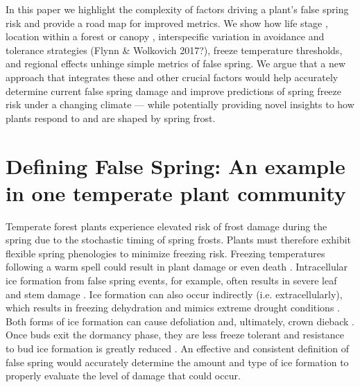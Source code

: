 \documentclass{article}\usepackage[]{graphicx}\usepackage[]{color}
\begin{document}
In this paper we highlight the complexity of factors driving a plant's false spring risk and provide a road map for improved metrics. We show how life stage \citep{Caffarra2011}, location within a forest or canopy \citep{Augspurger2013}, interspecific variation in avoidance and tolerance strategies (Flynn \& Wolkovich 2017?), freeze temperature thresholds, and regional effects \citep{Martin2010} unhinge simple metrics of false spring. We argue that a new approach that integrates these and other crucial factors would help accurately determine current false spring damage and improve predictions of spring freeze risk under a changing climate --- while potentially providing novel insights to how plants respond to and are shaped by spring frost. %

\section{Defining False Spring: An example in one temperate plant community}
Temperate forest plants experience elevated risk of frost damage during the spring due to the stochastic timing of spring frosts. 
Plants must therefore exhibit flexible spring phenologies to minimize freezing risk. Freezing temperatures following a warm spell could result in plant damage or even death \citep{Ludlum1968, Mock2007}. Intracellular ice formation from false spring events, for example, often results in severe leaf and stem damage \citep{Burke1976, Sakai1987}. Ice formation can also occur indirectly (i.e. extracellularly), which results in freezing dehydration and mimics extreme drought conditions \citep{Pearce2001, Beck2004, Hofmann2015}. Both forms of ice formation can cause defoliation and, ultimately, crown dieback \citep{Gu2008}. Once buds exit the dormancy phase, they are less freeze tolerant and resistance to bud ice formation is greatly reduced \citep{Taschler2004, Lenz2013, Vitasse2014a}. An effective and consistent definition of false spring would accurately determine the amount and type of ice formation to properly evaluate the level of damage that could occur.
\end{document}
